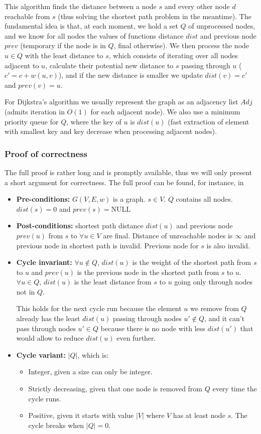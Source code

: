 This algorithm finds the distance between a node $s$ and every other node $d$ reachable from $s$ (thus solving the shortest path problem in the meantime). The fundamental idea is that, at each moment, we hold a set $Q$ of unprocessed nodes, and we know for all nodes the values of functions distance $dist$ and previous node $prev$ (temporary if the node is in $Q$, final otherwise). We then process the node $u \in Q$ with the least distance to $s$, which consists of iterating over all nodes adjacent to $u$, calculate their potential new distance to $s$ passing through $u$ ($c'=c+w(u,v)$), and if the new distance is smaller we update $dist(v)=c'$ and $prev(v)=u$.\par
For Dijkstra's algorithm we usually represent the graph as an adjacency list $Adj$ (admits iteration in $O(1)$ for each adjacent node). We also use a minimum priority queue for $Q$, where the key of $u$ is $dist(u)$ (fast extraction of element with smallest key and key decrease when processing adjacent nodes).
\subsubsection{Proof of correctness}
The full proof is rather long and is promptly available, thus we will only present a short argument for correctness. The full proof can be found, for instance, in \cite[p.~659]{intro-alg}
\begin{itemize}
    \item \textbf{Pre-conditions:} $G(V, E, w)$ is a graph. $s \in V$. $Q$ contains all nodes. $dist(s)=0$ and $prev(s)=\text{NULL}$
    \item \textbf{Post-conditions:} shortest path distance $dist(u)$ and previous node $prev(u)$ from $s$ to $\forall u \in V$ are final. Distance of unreachable nodes is $\infty$ and previous node in shortest path is invalid. Previous node for $s$ is also invalid.\par
    \item \textbf{Cycle invariant:} $\forall u \not \in Q$, $dist(u)$ is the weight of the shortest path from $s$ to $u$ and $prev(u)$ is the previous node in the shortest path from $s$ to $u$. $\forall u \in Q$, $dist(u)$ is the least distance from $s$ to $u$ going only through nodes not in $Q$.\par
    This holds for the next cycle run because the element $u$ we remove from $Q$ already has the least $dist(u)$ passing through nodes $u' \not \in Q$, and it can't pass through nodes $u' \in Q$ because there is no node with less $dist(u')$ that would allow to reduce $dist(u)$ even further.
    \item \textbf{Cycle variant:} $|Q|$, which is:
    \begin{itemize}
        \item Integer, given a size can only be integer.
        \item Strictly decreasing, given that one node is removed from $Q$ every time the cycle runs.
        \item Positive, given it starts with value $|V|$ where $V$ has at least node $s$. The cycle breaks when $|Q| = 0$.
    \end{itemize}
\end{itemize}
